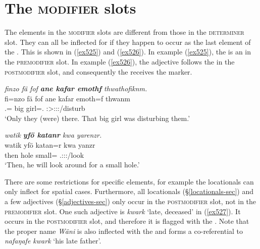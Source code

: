 \section{The \textsc{modifier} slots}\label{npsyntaxmodifier}

The elements in the \textsc{modifier} slots are different from those in the \textsc{determiner} slot. They can all be inflected for  if they happen to occur as the last element of the . This is shown in (\ref{ex525}) and (\ref{ex526}). In example (\ref{ex525}), the  is an  in the \textsc{premodifier} slot. In example (\ref{ex526}), the adjective follows the  in the \textsc{postmodifier} slot, and consequently the  receives the  marker.

\begin{exe}
	\ex \emph{finzo fä fof \textbf{ane kafar emothf} thwathofiknm.}\\
	\gll fi=nzo fä fof ane kafar emoth=f thwanm\\
	\Third.\Abs={\Only} {\Dist} {\Emph} {\Dem} big girl=\Erg.{\Sg} \Sg:\Sbj>\Stdu:\Obj:\Pst:\Dur/disturb\\
	\trans `Only they (were) there. That big girl was disturbing them.'
	\label{ex525}
\end{exe}
\begin{exe}
	\ex \emph{watik \textbf{yfö katanr} kwa yarenzr.}\\
	\gll watik yfö katan=r kwa yanzr\\
	then hole small={\Purp} {\Fut} \Tsg.\Masc:\Sbj:\Nonpast:\Ipfv/look\\
	\trans `Then, he will look around for a small hole.'
	\label{ex526}
\end{exe}

There are some restrictions for specific elements, for example the locationals can only inflect for spatial cases. Furthermore, all locationals ({\S}\ref{locationals-sec}) and a few adjectives ({\S}\ref{adjectives-sec}) only occur in the \textsc{postmodifier} slot, not in the \textsc{premodifier} slot. One such adjective is \emph{kwark} `late, deceased' in (\ref{ex527}). It occurs in the \textsc{postmodifier} slot, and therefore it is flagged with the  . Note that the proper name \emph{Wäni} is also inflected with the  and forms a  co-referential to \emph{nafaŋafe kwark} `his late father'.

